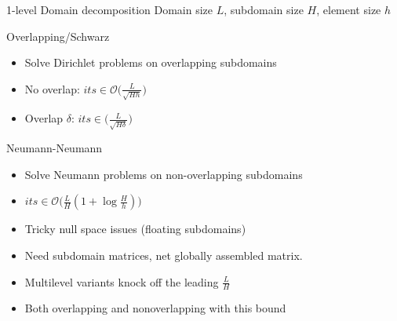 \begin{frame}{1-level Domain decomposition}
  Domain size $L$, subdomain size $H$, element size $h$
  \begin{block}{Overlapping/Schwarz}
    \begin{itemize}\item Solve Dirichlet problems on overlapping
      subdomains
    \item No overlap: $\textit{its} \in \mathcal{O}\big( \frac{L}{\sqrt{Hh}} \big)$
    \item Overlap $\delta$: $\textit{its} \in \big( \frac L {\sqrt{H\delta}} \big)$
    \end{itemize}
  \end{block}
  
  \begin{block}{Neumann-Neumann}
    \begin{itemize}
    \item Solve Neumann problems on non-overlapping subdomains
    \item $\textit{its} \in \mathcal{O}\big( \frac{L}{H}(1+\log\frac H h) \big)$
    \item Tricky null space issues (floating subdomains)
    \item Need subdomain matrices, net globally assembled matrix.
    \end{itemize}
  \end{block}
  \begin{itemize}
  \item Multilevel variants knock off the leading $\frac L H$
  \item Both overlapping and nonoverlapping with this bound
  \end{itemize}
\end{frame}

